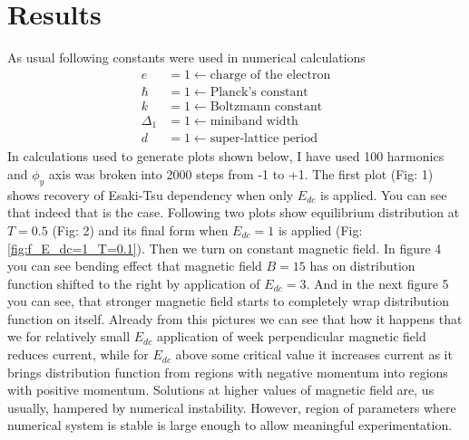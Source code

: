 \documentclass[40pt,letterpaper]{article}
\begin{document}
	\section{Results}
	As usual following constants were used in numerical calculations
		\begin{align*}
		e&=1 \leftarrow \text{charge of the electron}\\
		\hbar&=1 \leftarrow \text{Planck's constant}\\
		k&=1 \leftarrow \text{Boltzmann constant}\\
		\Delta_1&=1 \leftarrow \text{miniband width}\\
		d&=1 \leftarrow \text{super-lattice period}
	\end{align*}
	In calculations used to generate plots shown below, I have used 100 harmonics and $\phi_y$ axis was broken into 2000 steps from -1 to +1. 
	The first plot (Fig: 1) shows recovery of Esaki-Tsu dependency when only $E_{dc}$ is applied.
	You can see that indeed that is the case. Following two plots show equilibrium distribution at $T=0.5$ (Fig: 2) and its final form when $E_{dc}=1$ is applied (Fig: \ref{fig:f_E_dc=1_T=0.1}). Then we turn on constant magnetic field. In figure 
	4 you can see bending effect that magnetic field $B=15$ has on distribution function shifted to the right by application of $E_{dc}=3$. And in the next figure 5 you can see, that stronger magnetic field starts to completely wrap distribution function on itself. Already from this pictures we can see that how it happens that we for relatively small $E_{dc}$ application of week perpendicular magnetic field reduces current, while for $E_{dc}$ above some critical value it increases current as it brings distribution function from regions with negative momentum into regions with positive momentum. Solutions at higher values of magnetic field are, us usually, hampered by numerical instability. However, region of parameters where numerical system is stable is large enough to allow meaningful experimentation.
	
	
\end{document}

